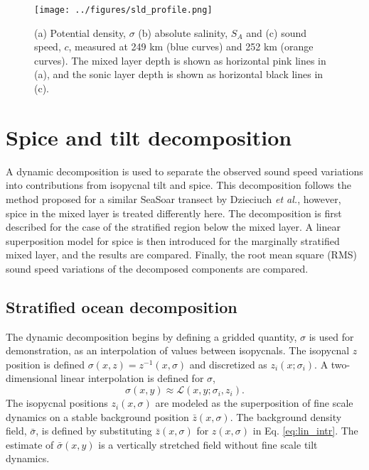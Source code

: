 \documentclass[preprint,NumberedRefs]{JASA}
\begin{document}
\begin{figure}
    \texttt{[image: ../figures/sld\_profile.png]}
    \caption{\label{fig:profiles}{(a) Potential density, $\sigma$ (b) absolute salinity, $S_A$ and (c) sound speed, $c$, measured at 249 km (blue curves) and 252 km (orange curves). The mixed layer depth is shown as horizontal pink lines in (a), and the sonic layer depth is shown as horizontal black lines in (c).}}
\end{figure}

\section{\label{sec:decomposition}Spice and tilt decomposition}
A dynamic decomposition is used to separate the observed sound speed variations into contributions from isopycnal tilt and spice. This decomposition follows the method proposed for a similar SeaSoar transect by Dzieciuch \emph{et al.},\citep{dzieciuch2004} however, spice in the mixed layer is treated differently here. The decomposition is first described for the case of the stratified region below the mixed layer. A linear superposition model for spice is then introduced for the marginally stratified mixed layer, and the results are compared. Finally, the root mean square (RMS) sound speed variations of the decomposed components are compared.

\subsection{Stratified ocean decomposition}
The dynamic decomposition begins by defining a gridded quantity, $\sigma$ is used for demonstration, as an interpolation of values between isopycnals. The isopycnal $z$ position is defined $\sigma(x, z) = z^{-1}(x, \sigma)$ and discretized as $z_i(x; \sigma_i)$. A two-dimensional linear interpolation is defined for $\sigma$,
\begin{equation}
    \sigma(x,y)\approx\mathcal{L}(x, y; \sigma_i, z_i).
    \label{eq:lin_intr}
\end{equation}
The isopycnal positions $z_i(x, \sigma)$ are modeled as the superposition of fine scale dynamics on a stable background position $\bar{z}(x, \sigma)$. The background density field, $\bar{\sigma}$, is defined by substituting $\bar{z}(x, \sigma)$ for $z(x, \sigma)$ in Eq. \eqref{eq:lin_intr}. The estimate of $\bar{\sigma}(x,y)$ is a vertically stretched field without fine scale tilt dynamics.
\end{document}
